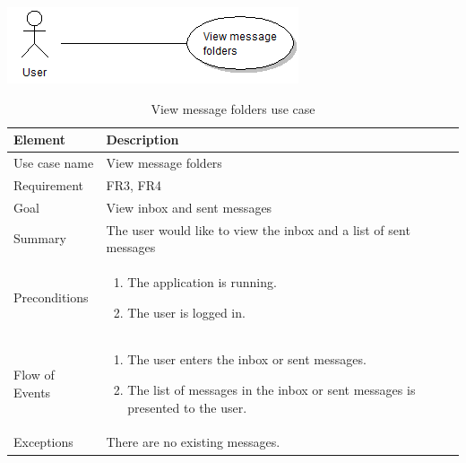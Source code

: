 \begin{table}
\begin{center}
\begin{center}
\includegraphics[width=\textwidth]{view_message_folders}
\end{center}
\begin{tabular}{p{3cm}|p{12cm}} \hline
\textbf{Element} & \textbf{Description} \\ \hline \hline
Use case name & View message folders \\ \hline
Requirement & FR3, FR4 \\
Goal & View inbox and sent messages \\ \hline
Summary &The user would like to view the inbox and a list of sent messages \\ \hline
Preconditions &
\begin{enumerate}
\item{}The application is running.
\item{}The user is logged in.
\end{enumerate} \\ \hline
Flow of Events &
\begin{enumerate}
\item{}The user enters the inbox or sent messages.
\item{}The list of messages in the inbox or sent messages is presented to the user.
\end{enumerate} \\ \hline
Exceptions & There are no existing messages.\\ \hline
\end{tabular}
\end{center}
\caption{View message folders use case} \label{tab:viewmessagefolders}
\end{table}

